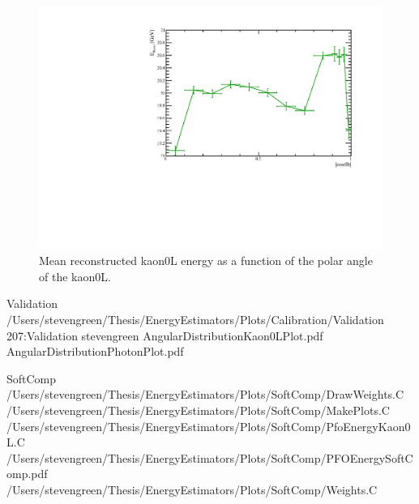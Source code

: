 \begin{figure}
  \includegraphics[width=\largefigwidth]{EnergyEstimators/Plots/Calibration/Validation/AngularDistributionKaon0LPlot.pdf}  \caption[Mean reconstructed kaon0L energy as a function of the polar angle of the kaon0L.]{Mean reconstructed kaon0L energy as a function of the polar angle of the kaon0L.}
    \label{engest:fig:photonangle}
    \end{figure}


\iffalse
Validation 
/Users/stevengreen/Thesis/EnergyEstimators/Plots/Calibration/Validation
207:Validation stevengreen
AngularDistributionKaon0LPlot.pdf AngularDistributionPhotonPlot.pdf

SoftComp
/Users/stevengreen/Thesis/EnergyEstimators/Plots/SoftComp/DrawWeights.C /Users/stevengreen/Thesis/EnergyEstimators/Plots/SoftComp/MakePlots.C /Users/stevengreen/Thesis/EnergyEstimators/Plots/SoftComp/PfoEnergyKaon0L.C /Users/stevengreen/Thesis/EnergyEstimators/Plots/SoftComp/PFOEnergySoftComp.pdf /Users/stevengreen/Thesis/EnergyEstimators/Plots/SoftComp/Weights.C 

